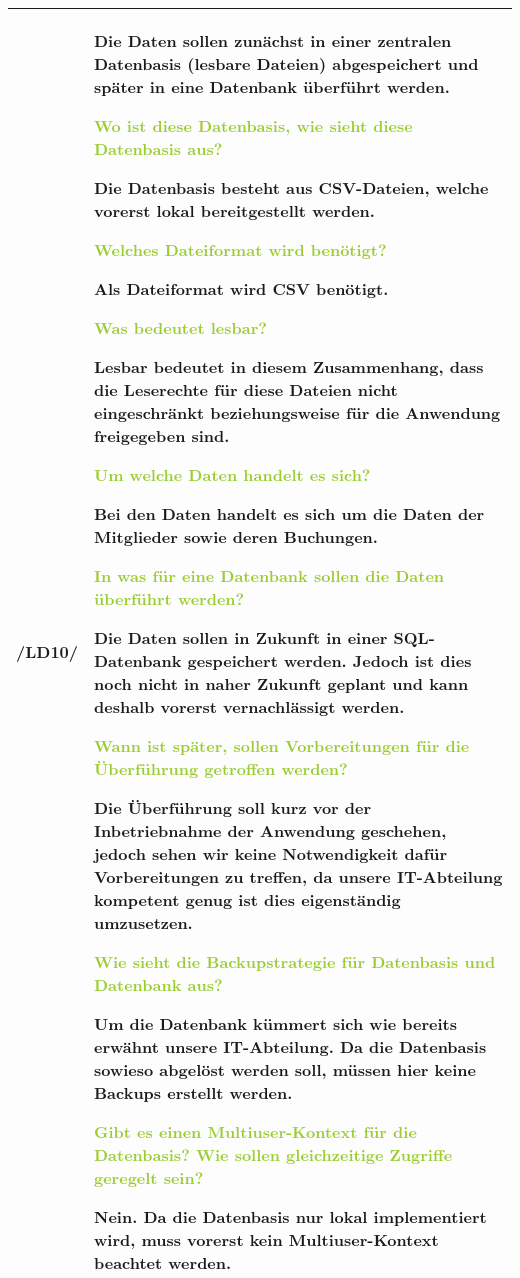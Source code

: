 \begin{center}
    \begin{tabular}[ht] {l | p{13cm}}
        \hline
        /LD10/ & Die Daten sollen zunächst in einer zentralen Datenbasis (lesbare Dateien) abgespeichert und später in eine Datenbank überführt werden. 
        
        \textcolor{YellowGreen}{Wo ist diese Datenbasis, wie sieht diese Datenbasis aus?}
        
        \textcolor{NavyBlue}{Die Datenbasis besteht aus CSV-Dateien, welche vorerst lokal bereitgestellt werden.}

        \textcolor{YellowGreen}{Welches Dateiformat wird benötigt?}

        \textcolor{NavyBlue}{Als Dateiformat wird CSV benötigt.}

        \textcolor{YellowGreen}{Was bedeutet lesbar?}

        \textcolor{NavyBlue}{Lesbar bedeutet in diesem Zusammenhang, dass die Leserechte für diese Dateien nicht eingeschränkt beziehungsweise für die Anwendung freigegeben sind.}

        \textcolor{YellowGreen}{Um welche Daten handelt es sich?}

        \textcolor{NavyBlue}{Bei den Daten handelt es sich um die Daten der Mitglieder sowie deren Buchungen.}

        \textcolor{YellowGreen}{In was für eine Datenbank sollen die Daten überführt werden?}

        \textcolor{NavyBlue}{Die Daten sollen in Zukunft in einer SQL-Datenbank gespeichert werden. Jedoch ist dies noch nicht in naher Zukunft geplant und kann deshalb vorerst vernachlässigt werden.}

        \textcolor{YellowGreen}{Wann ist später, sollen Vorbereitungen für die Überführung getroffen werden?}

        \textcolor{NavyBlue}{Die Überführung soll kurz vor der Inbetriebnahme der Anwendung geschehen, jedoch sehen wir keine Notwendigkeit dafür Vorbereitungen zu treffen, da unsere IT-Abteilung kompetent genug ist dies eigenständig umzusetzen.}

        \textcolor{YellowGreen}{Wie sieht die Backupstrategie für Datenbasis und Datenbank aus?}

        \textcolor{NavyBlue}{Um die Datenbank kümmert sich wie bereits erwähnt unsere IT-Abteilung. Da die Datenbasis sowieso abgelöst werden soll, müssen hier keine Backups erstellt werden.}

        \textcolor{YellowGreen}{Gibt es einen Multiuser-Kontext für die \grqq{}Datenbasis\grqq{}? Wie sollen gleichzeitige Zugriffe geregelt sein?}

        \textcolor{NavyBlue}{Nein. Da die Datenbasis nur lokal implementiert wird, muss vorerst kein Multiuser-Kontext beachtet werden.} \\
        \hline
        
    \end{tabular}
\end{center}


